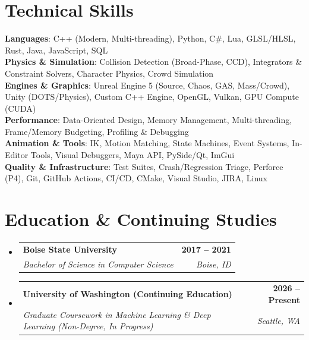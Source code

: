 \documentclass[letterpaper,11pt]{article}
\makeatletter
\newcommand{\resumeSubheading}[4]{
  \vspace{-2pt}\item
    \begin{tabular*}{1.0\textwidth}[t]{l@{\extracolsep{\fill}}r}
      \textbf{#1} & \textbf{\small #2} \\
      \textit{\small#3} & \textit{\small #4} \\
    \end{tabular*}\vspace{-7pt}
}
\newcommand{\resumeSubHeadingListStart}{\begin{itemize}[leftmargin=0.0in, label={}]}
\newcommand{\resumeSubHeadingListEnd}{\end{itemize}}
\makeatother
\begin{document}
\section{Technical Skills}
 \begin{itemize}[leftmargin=0.15in, label={}]
    \small{\item{
     \textbf{Languages}{: C++ (Modern, Multi-threading), Python, C\#, Lua, GLSL/HLSL, Rust, Java, JavaScript, SQL} \\
     \textbf{Physics \& Simulation}{: Collision Detection (Broad-Phase, CCD), Integrators \& Constraint Solvers, Character Physics, Crowd Simulation} \\
     \textbf{Engines \& Graphics}{: Unreal Engine 5 (Source, Chaos, GAS, Mass/Crowd), Unity (DOTS/Physics), Custom C++ Engine, OpenGL, Vulkan, GPU Compute (CUDA)} \\
     \textbf{Performance}{: Data-Oriented Design, Memory Management, Multi-threading, Frame/Memory Budgeting, Profiling \& Debugging} \\
     \textbf{Animation \& Tools}{: IK, Motion Matching, State Machines, Event Systems, In-Editor Tools, Visual Debuggers, Maya API, PySide/Qt, ImGui} \\
     \textbf{Quality \& Infrastructure}{: Test Suites, Crash/Regression Triage, Perforce (P4), Git, GitHub Actions, CI/CD, CMake, Visual Studio, JIRA, Linux}
    }}
 \end{itemize}
 \vspace{-12pt}

\section{Education \& Continuing Studies}
  \resumeSubHeadingListStart
    \resumeSubheading
      {Boise State University}{2017 -- 2021}
      {Bachelor of Science in Computer Science}{Boise, ID}
    \resumeSubheading
      {University of Washington (Continuing Education)}{2026 -- Present}
      {Graduate Coursework in Machine Learning \& Deep Learning (Non-Degree, In Progress)}{Seattle, WA}
  \resumeSubHeadingListEnd
\end{document}
